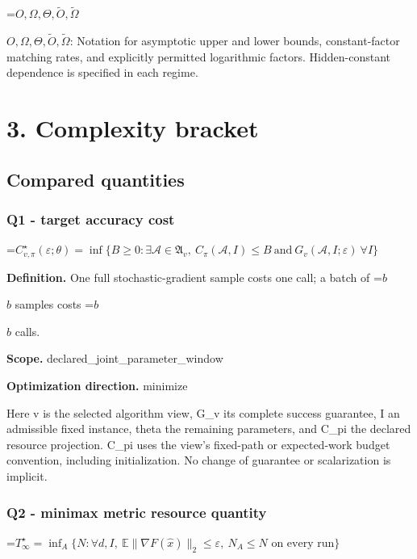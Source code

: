 \documentclass[10pt,a4paper]{article}
\newcommand{\AtlasMath}[1]{\par\begingroup\centering\setbox0=\hbox{$\displaystyle #1$}\ifdim\wd0>1.4\linewidth\typeout{ATLAS WIDE FORMULA: \the\wd0}\fi\ifdim\wd0>\linewidth\resizebox{\linewidth}{!}{\box0}\else\box0\fi\par\endgroup}
\newcommand{\AtlasInlineMath}[1]{\begingroup\setbox0=\hbox{$#1$}\ifdim\wd0>.4\linewidth\endgroup\AtlasMath{#1}\else\endgroup$#1$\fi}
\begin{document}
\AtlasInlineMath{O,\Omega,\Theta,\widetilde{O},\widetilde\Omega}: Notation for asymptotic upper and lower bounds, constant-factor matching rates, and explicitly permitted logarithmic factors. Hidden-constant dependence is specified in each regime.



\section{3. Complexity bracket}


\subsection{Compared quantities}


\subsubsection{Q1 - target accuracy cost}


\AtlasMath{C^\star_{v,\pi}(\varepsilon;\theta)=\inf\{B\ge0:\exists\mathcal A\in\mathfrak A_v,\ C_\pi(\mathcal A,I)\le B\ \text{and}\ G_v(\mathcal A,I;\varepsilon)\ \forall I\}}


\textbf{Definition.} One full stochastic-gradient sample costs one call; a batch of \AtlasInlineMath{b} samples costs \AtlasInlineMath{b} calls.



\textbf{Scope.} declared\_joint\_parameter\_window



\textbf{Optimization direction.} minimize



Here v is the selected algorithm view, G\_v its complete success guarantee, I an admissible fixed instance, theta the remaining parameters, and C\_pi the declared resource projection. C\_pi uses the view's fixed-path or expected-work budget convention, including initialization. No change of guarantee or scalarization is implicit.



\subsubsection{Q2 - minimax metric resource quantity}


\AtlasMath{T^\star_\infty=\inf_A\{N:\forall d,I,\ \mathbb E\|\nabla F(\widehat x)\|_2\le\varepsilon,\ N_A\le N\text{ on every run}\}}
\end{document}
